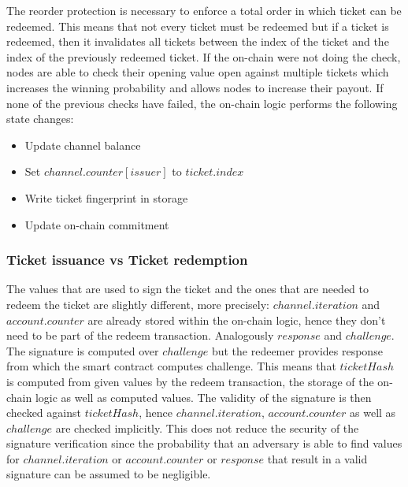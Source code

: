 \newline The reorder protection is necessary to enforce a total order in which ticket can be redeemed. 
This means that not every ticket must be redeemed but if a ticket is redeemed, then it invalidates all tickets between the index of the ticket and the index of the previously redeemed ticket. 
If the on-chain were not doing the check, nodes are able to check their opening value open against multiple tickets which increases the winning probability and allows nodes to increase their payout.
If none of the previous checks have failed, the on-chain logic performs the following state changes:
\begin{itemize}
    \item Update channel balance
    \item Set $channel.counter[issuer]$ to $ticket.index$
    \item Write ticket fingerprint in storage
    \item Update on-chain commitment
\end{itemize}


\subsubsection{Ticket issuance vs Ticket redemption}
The values that are used to sign the ticket and the ones that are needed to redeem the ticket are slightly different, 
more precisely: $channel.iteration$ and $account.counter$ are already stored within the on-chain logic, hence they don’t need to be part of the redeem transaction. 
Analogously $response$ and $challenge$. 
The signature is computed over $challenge$ but the redeemer provides response from which the smart contract computes challenge.
\newline This means that $ticketHash$ is computed from given values by the redeem transaction, 
the storage of the on-chain logic as well as computed values.
The validity of the signature is then checked against $ticketHash$, hence $channel.iteration$, $account.counter$ as well as $challenge$ are checked implicitly. 
This does not reduce the security of the signature verification since the probability that an adversary is able to find values for $channel.iteration$ or $account.counter$ or $response$ that result in a valid signature can be assumed to be negligible.
 



